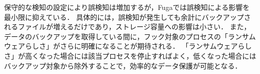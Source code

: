 保守的な検知の設定により誤検知は増加するが，Fugaでは誤検知による影響を最小限に抑えている．
具体的には，誤検知が発生しても余計にバックアップされるファイルが増えるだけであり，ストレージ容量への影響は小さい．
また，データのバックアップを取得している間に，フック対象のプロセスの「ランサムウェアらしさ」がさらに明確になることが期待される．
「ランサムウェアらしさ」が高くなった場合には該当プロセスを停止すればよく，低くなった場合にはバックアップ対象から除外することで，効率的なデータ保護が可能となる．




